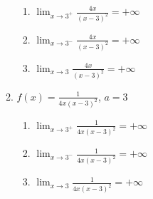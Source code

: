 \documentclass[a4paper, 12pt]{article}
\begin{document}
\begin{enumerate}
\begin{enumerate}
        \begin{enumerate}
            \item $\lim_{x \to 3^+}\frac{4x}{(x-3)^2}=+\infty$
            \item $\lim_{x \to 3^-}\frac{4x}{(x-3)^2}=+\infty$
            \item $\lim_{x \to 3}\frac{4x}{(x-3)^2}=+\infty$
        \end{enumerate}

        \item $f(x) = \frac{1}{4x(x-3)^2}$, $a=3$
        
        \begin{enumerate}
            \item $\lim_{x \to 3^+}\frac{1}{4x(x-3)^2}=+\infty$
            \item $\lim_{x \to 3^-}\frac{1}{4x(x-3)^2}=+\infty$
            \item $\lim_{x \to 3}\frac{1}{4x(x-3)^2}=+\infty$ 
        \end{enumerate}
    \end{enumerate}
    
    
\end{enumerate}
\end{document}
